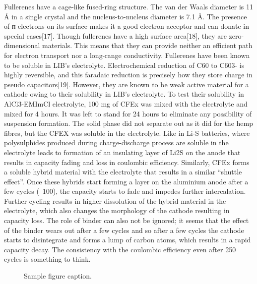 \documentclass{article}
\begin{document}
Fullerenes have a cage-like fused-ring structure. The van der Waals diameter is 11 Å in a single crystal and the nucleus-to-nucleus diameter is 7.1 Å. The presence of ᴨ-electrons on its surface makes it a good electron acceptor and can donate in special cases[17]. Though fullerenes have a high surface area[18], they are zero-dimensional materials. This means that they can provide neither an efficient path for electron transport nor a long-range conductivity. Fullerenes have been known to be soluble in LIB’s electrolyte. Electrochemical reduction of C60 to C603- is highly reversible, and this faradaic reduction is precisely how they store charge in pseudo capacitors[19]. However, they are known to be weak active material for a cathode owing to their solubility in LIB’s electrolyte. To test their solubility in AlCl3-EMImCl electrolyte, 100 mg of CFEx was mixed with the electrolyte and mixed for 4 hours. It was left to stand for 24 hours to eliminate any possibility of suspension formation. The solid phase did not separate out as it did for the hemp fibres, but the CFEX was soluble in the electrolyte. Like in Li-S batteries, where polysulphides produced during charge-discharge process are soluble in the electrolyte leads to formation of an insulating layer of Li2S on the anode that results in capacity fading and loss in coulombic efficiency. Similarly, CFEx forms a soluble hybrid material with the electrolyte that results in a similar “shuttle effect”. Once these hybrids start forming a layer on the aluminium anode after a few cycles (~100), the capacity starts to fade and impedes further intercalation. Further cycling results in higher dissolution of the hybrid material in the electrolyte, which also changes the morphology of the cathode resulting in capacity loss. The role of binder can also not be ignored; it seems that the effect of the binder wears out after a few cycles and so after a few cycles the cathode starts to disintegrate and forms a lump of carbon atoms, which results in a rapid capacity decay. The consistency with the coulombic efficiency even after 250 cycles is something to think.   

\begin{figure}
  \centering
  \fbox{\rule[-.5cm]{4cm}{4cm} \rule[-.5cm]{4cm}{0cm}}
  \caption{Sample figure caption.}
  \label{fig:fig1}
\end{figure}
\end{document}
